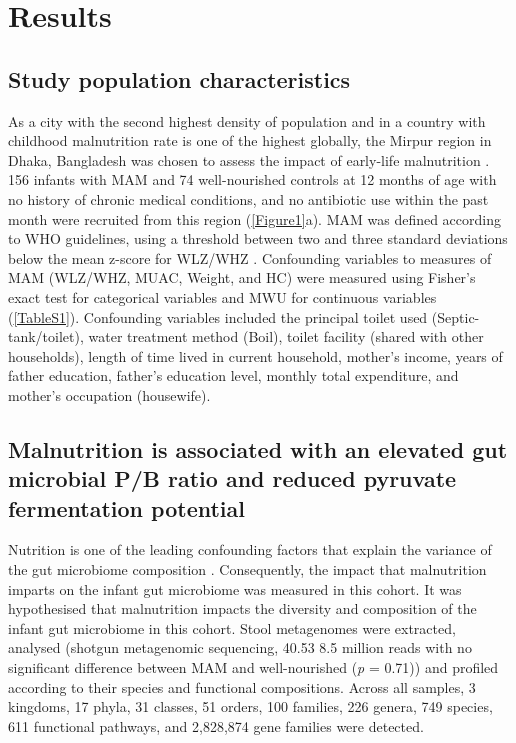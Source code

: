 \documentclass{article}
\begin{document}
\section*{Results}
\subsection*{Study population characteristics}
As a city with the second highest density of population and in a country with childhood malnutrition rate is one of the highest globally, the Mirpur region in Dhaka, Bangladesh was chosen to assess the impact of early-life malnutrition \cite{ahmed2012nutrition}.
156 infants with \gls{MAM} and 74 well-nourished controls at 12 months of age with no history of chronic medical conditions, and no antibiotic use within the past month were recruited from this region (\autoref{Figure1}a).
\gls{MAM} was defined according to WHO guidelines, using a threshold between two and three standard deviations below the mean z-score for \gls{WLZ/WHZ} \cite{lenters2016management}.
Confounding variables to measures of \gls{MAM} (\gls{WLZ/WHZ}, \gls{MUAC}, Weight, and \gls{HC}) were measured using Fisher’s exact test for categorical variables and \gls{MWU} for continuous variables (\autoref{TableS1}).
Confounding variables included the principal toilet used (Septic-tank/toilet), water treatment method (Boil), toilet facility (shared with other households), length of time lived in current household, mother’s income, years of father education, father’s education level, monthly total expenditure, and mother’s occupation (housewife). 

\subsection*{Malnutrition is associated with an elevated gut microbial \gls{P/B} ratio and reduced pyruvate fermentation potential}
Nutrition is one of the leading confounding factors that explain the variance of the gut microbiome composition \cite{wastyk2021gut}.
Consequently, the impact that malnutrition imparts on the infant gut microbiome was measured in this cohort.
It was hypothesised that malnutrition impacts the diversity and composition of the infant gut microbiome in this cohort.
Stool metagenomes were extracted, analysed (shotgun metagenomic sequencing, 40.53 \textpm{} 8.5 million reads with no significant difference between \gls{MAM} and well-nourished (\textit{p} = 0.71)) and profiled according to their species and functional compositions.
Across all samples, 3 kingdoms, 17 phyla, 31 classes, 51 orders, 100 families, 226 genera, 749 species, 611 functional pathways, and 2,828,874 gene families were detected.
\end{document}

